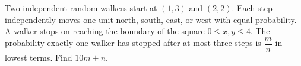 Two independent random walkers start at $(1,3)$ and $(2,2)$. Each step independently moves one unit north, south, east, or west with equal probability. A walker stops on reaching the boundary of the square $0\le x,y\le4$. The probability exactly one walker has stopped after at most three steps is $\dfrac{m}{n}$ in lowest terms. Find $10m+n$.
